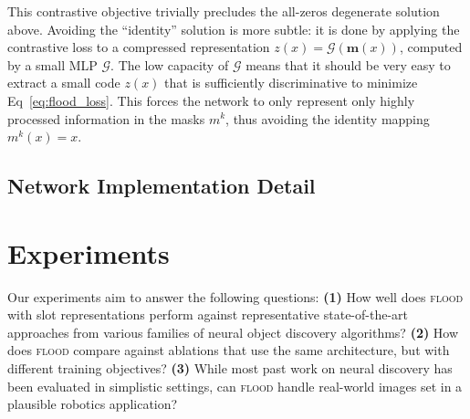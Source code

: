 \documentclass{article}
\newcommand{\jd}[1]{\textcolor{orange}{[DJ: #1]}}
\begin{document}
This contrastive objective trivially precludes the all-zeros degenerate solution above. Avoiding the ``identity'' solution is more subtle: it is done by applying the contrastive loss to a compressed representation $z(x)=\mathcal{G}(\bm{m}(x))$, computed by a small MLP $\mathcal{G}$. The low capacity of $\mathcal{G}$ means that it should be very easy to extract a small code $z(x)$ that is sufficiently discriminative to minimize Eq~\ref{eq:flood_loss}. This forces the network to only represent only highly processed information in the masks $m^k$, thus avoiding the identity mapping $m^k(x)=x$. 

\subsection{Network Implementation Detail}








\section{Experiments}
\label{sec:experiments}

Our experiments aim to answer the following questions: \textbf{(1)} How well does \textsc{flood} with slot representations perform against representative state-of-the-art approaches from various families of neural object discovery algorithms? \textbf{(2)} How does \textsc{flood} compare against ablations that use the same architecture, but with different training objectives? \textbf{(3)} While most past work on neural discovery has been evaluated in simplistic settings, can \textsc{flood} handle real-world images set in a plausible robotics application?
\end{document}
